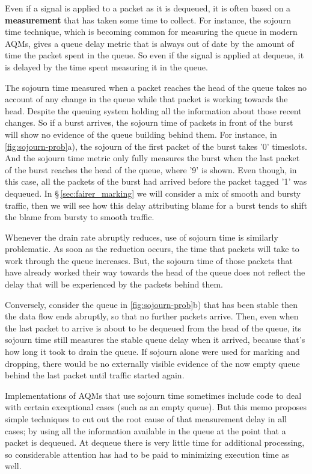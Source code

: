 Even if a signal is applied to a packet as it is dequeued, it is often based on a \textbf{measurement} that has taken some time to collect. For instance, the sojourn time technique, which is becoming common for measuring the queue in modern AQMs, gives a queue delay metric that is always out of date by the amount of time the packet spent in the queue. So even if the signal is applied at dequeue, it is delayed by the time spent measuring it in the queue.

The sojourn time measured when a packet reaches the head of the queue takes no account of any change in the queue while that packet is working towards the head. Despite the queuing system holding all the information about those recent changes. So if a burst arrives, the sojourn time of packets in front of the burst will show no evidence of the queue building behind them. For instance, in \autoref{fig:sojourn-prob}a), the sojourn of the first packet of the burst takes '0' timeslots. And the sojourn time metric only fully measures the burst when the last packet of the burst reaches the head of the queue, where '9' is shown. Even though, in this case, all the packets of the burst had arrived before the packet tagged '1' was dequeued. In \S\,\ref{sec:fairer_marking} we will consider a mix of smooth and bursty traffic, then we will see how this delay attributing blame for a burst tends to shift the blame from bursty to smooth traffic.

Whenever the drain rate abruptly reduces, use of sojourn time is similarly problematic. As soon as the reduction occurs, the time that packets will take to work through the queue increases. But, the sojourn time of those packets that have already worked their way towards the head of the queue does not reflect the delay that will be experienced by the packets behind them.

Conversely, consider the queue in \autoref{fig:sojourn-prob}b) that has been stable then the data flow ends abruptly, so that no further packets arrive. Then, even when the last packet to arrive is about to be dequeued from the head of the queue, its sojourn time still measures the stable queue delay when it arrived, because that's how long it took to drain the queue. If sojourn alone were used for marking and dropping, there would be no externally visible evidence of the now empty queue behind the last packet until traffic started again.

Implementations of AQMs that use sojourn time sometimes include code to deal with certain exceptional cases (such as an empty queue). But this memo proposes simple techniques to cut out the root cause of that measurement delay in all cases; by using all the information available in the queue at the point that a packet is dequeued. At dequeue there is very little time for additional processing, so considerable attention has had to be paid to minimizing execution time as well.
